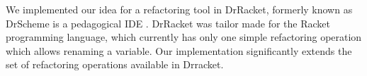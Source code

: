 We implemented our idea for a refactoring tool in DrRacket, formerly known as
DrScheme is a pedagogical IDE \cite{drscheme} \cite{drscheme_pegadogy}.
DrRacket was tailor made for the Racket programming language, which currently
has only one simple refactoring operation which allows renaming a variable.
Our implementation significantly extends the set of refactoring operations available
in Drracket.



